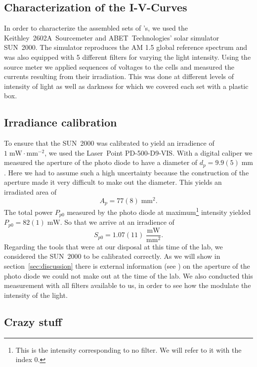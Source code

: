 \documentclass[a4paper,10pt,twocolumn]{article}
\begin{document}
\begin{extract*}

\section{Characterization of the I-V-Curves}\label{sec:charac}

In order to characterize the assembled sets of \BHSC's, we used the Keithley~2602A~Sourcemeter and ABET~Technologies’ solar simulator SUN~2000. The simulator reproduces the AM 1.5 global reference spectrum and was also equipped with 5 different filters for varying the light intensity. Using the source meter we applied sequences of voltages to the cells and measured the currents resulting from their irradiation. This was done at different levels of intensity of light as well as darkness for which we covered each set with a plastic box.
\subsection{Irradiance calibration}
To ensure that the SUN~2000 was calibrated to yield an irradience of $1\;\text{mW}\!\cdot\text{mm}^{-2}$, we used the Laser~Point PD-500-D9-VIS. With a digital caliper we measured the aperture of the photo diode to have a diameter of $d_p = 9.9(5)\;\text{mm}$. Here we had to assume such a high uncertainty because the construction of the aperture made it very difficult to make out the diameter. This yields an irradiated area of
\begin{equation*}
	A_p =  77(8)\;\text{mm}^2.
\end{equation*}
The total power $P_{p0}$ measured by the photo diode at maximum\footnote{This is the intensity corresponding to no filter. We will refer to it with the index 0.} intensity yielded $P_{p0} = 82(1)\;\text{mW}$. So that we arrive at an irradience of
\begin{equation*}
	S_{p0} = 1.07(11)\;\frac{\text{mW}}{\text{mm}^2}.
\end{equation*}
Regarding the tools that were at our disposal at this time of the lab, we considered the SUN~2000 to be calibrated correctly. As we will show in section~\ref{sec:discussion} there is external information (see \cite{photodiode}) on the aperture of the photo diode we could not make out at the time of the lab.\mypar
We also conducted this measurement with all filters available to us, in order to see how the modulate the intensity of the light. 

\subsection{Crazy stuff}



\end{extract*}
\end{document}
